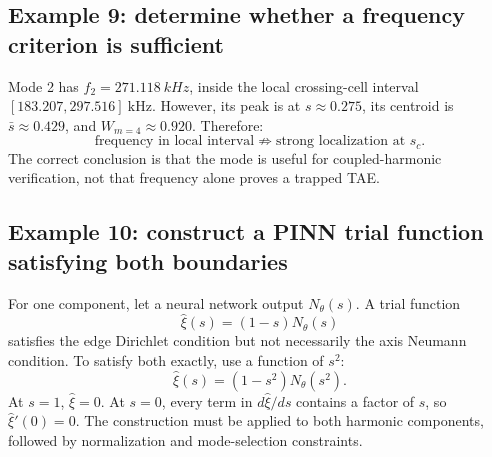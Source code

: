 \subsection{Example 9: determine whether a frequency criterion is sufficient}
Mode 2 has $f_2=\SI{271.118}{kHz}$, inside the local crossing-cell interval $[183.207,297.516]\ \mathrm{kHz}$. However, its peak is at $s\approx0.275$, its centroid is $\bar s\approx0.429$, and $W_{m=4}\approx0.920$. Therefore:
\begin{equation}
\text{frequency in local interval}
\not\Rightarrow
\text{strong localization at }s_c.
\end{equation}
The correct conclusion is that the mode is useful for coupled-harmonic verification, not that frequency alone proves a trapped TAE.

\subsection{Example 10: construct a PINN trial function satisfying both boundaries}
For one component, let a neural network output $N_\theta(s)$. A trial function
\begin{equation}
\widehat\xi(s)=(1-s)N_\theta(s)
\end{equation}
satisfies the edge Dirichlet condition but not necessarily the axis Neumann condition. To satisfy both exactly, use a function of $s^2$:
\begin{equation}
\boxed{\widehat\xi(s)=(1-s^2)N_\theta(s^2).}
\end{equation}
At $s=1$, $\widehat\xi=0$. At $s=0$, every term in $d\widehat\xi/ds$ contains a factor of $s$, so $\widehat\xi'(0)=0$. The construction must be applied to both harmonic components, followed by normalization and mode-selection constraints.
